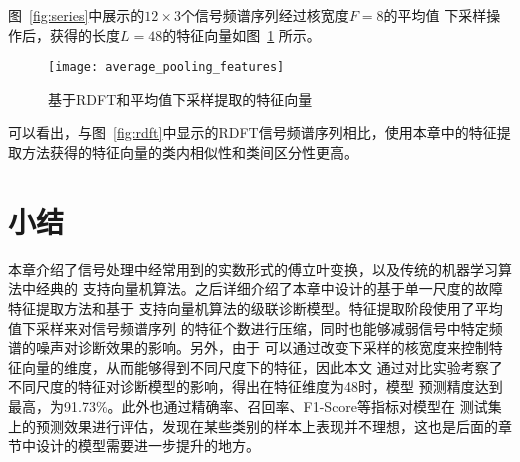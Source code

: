 图~\ref{fig:series}中展示的$12\times 3$个信号频谱序列经过核宽度$F=8$的平均值
下采样操作后，获得的长度$L=48$的特征向量如图~\ref{fig:average_pooling_features}
所示。
\begin{figure}[ht]
  \centering
  \texttt{[image: average\_pooling\_features]}
  \caption{基于RDFT和平均值下采样提取的特征向量}
  \label{fig:average_pooling_features}
\end{figure}

可以看出，与图~\ref{fig:rdft}中显示的RDFT信号频谱序列相比，使用本章中的特征提
取方法获得的特征向量的类内相似性和类间区分性更高。

\section{小结}

本章介绍了信号处理中经常用到的实数形式的傅立叶变换，以及传统的机器学习算法中经典的
支持向量机算法。之后详细介绍了本章中设计的基于单一尺度的故障特征提取方法和基于
支持向量机算法的级联诊断模型。特征提取阶段使用了平均值下采样来对信号频谱序列
的特征个数进行压缩，同时也能够减弱信号中特定频谱的噪声对诊断效果的影响。另外，由于
可以通过改变下采样的核宽度来控制特征向量的维度，从而能够得到不同尺度下的特征，因此本文
通过对比实验考察了不同尺度的特征对诊断模型的影响，得出在特征维度为48时，模型
预测精度达到最高，为91.73\%。此外也通过精确率、召回率、F1-Score等指标对模型在
测试集上的预测效果进行评估，发现在某些类别的样本上表现并不理想，这也是后面的章
节中设计的模型需要进一步提升的地方。
